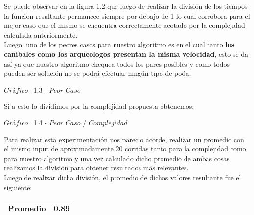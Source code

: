 Se puede observar en la figura 1.2 que luego de realizar la divisi\'on de los tiempos la funcion resultante permanece siempre por debajo de 1 lo cual corrobora para el mejor caso que el mismo se encuentra correctamente acotado por la complejidad calculada anteriormente.\\

Luego, uno de los peores casos para nuestro algoritmo es en el cual tanto \textbf{los canibales como los arqueologos presentan la misma velocidad}, esto se da as\'i ya que nuestro algoritmo chequea todos los pares posibles y como todos pueden ser soluci\'on no se podr\'a efectuar ning\'un tipo de poda.\\


\vspace*{0.3cm} \vspace*{0.3cm}
  \begin{center}
{$Gr$\'a$fico$ \ 1.3 - $Peor$ $Caso$}
  \end{center}
  \vspace*{0.3cm}

Si a esto lo dividimos por la complejidad propuesta obtenemos:\\

\vspace*{0.3cm} \vspace*{0.3cm}
  \begin{center}
 {$Gr$\'a$fico$ \ 1.4 - $Peor$ $Caso$ / $Complejidad$}
  \end{center}
   \vspace*{0.3cm}
  
  Para realizar esta experimentaci\'on nos parecio acorde, realizar un promedio con el mismo input de aproximadamente 20 corridas tanto para la complejidad como para nuestro algoritmo y una vez calculado dicho promedio de ambas cosas realizamos la divisi\'on para obtener resultados m\'as relevantes.\\ 

Luego de realizar dicha divisi\'on, el promedio de dichos valores resultante fue el siguiente:

\begin{center}
\begin{table}[H]
    \begin{tabular}{ | l |l |}
    \hline
	
    \textbf{Promedio} &  0.89 \\ \hline

    \end{tabular}
\end{table}
\end{center}

